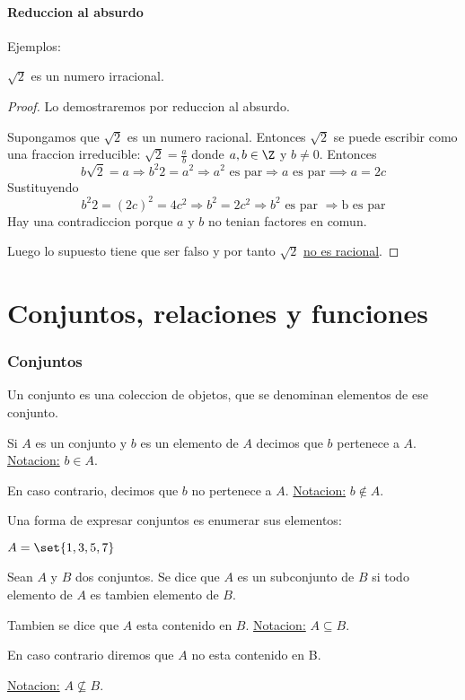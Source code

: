 \subsection*{Reduccion al absurdo}
Ejemplos:
\begin{theorem}
	\(\sqrt{2} \) es un numero irracional.
\end{theorem}
\begin{proof}
	Lo demostraremos por reduccion al absurdo.

	Supongamos que \(\sqrt{2} \) es un numero racional. Entonces \(\sqrt{2} \) se puede escribir como una fraccion irreducible: \(\sqrt{2 } = \frac{a}{b } \) donde \(a,b \in \Z \) y \(b \neq 0 \). Entonces
	\[
		b\sqrt{2} = a \Rightarrow b^{2}2 = a^{2} \Rightarrow a^{2} \text{ es par} \Rightarrow a \text{ es par} \implies a = 2c
	\]
	Sustituyendo
	\[
		b^{2}2 = (2c)^{2} = 4c^{2} \Rightarrow b^{2} = 2c^{2} \Rightarrow b^{2 } \text{ es par } \Rightarrow \boxed{\text{b es par} }
	\]
	Hay una contradiccion porque \(a \) y \(b \) no tenian factores en comun.

	Luego lo supuesto tiene que ser falso y por tanto \(\sqrt{2} \) \underline{no es racional}.
\end{proof}

\part{Conjuntos, relaciones y funciones}
\section{Conjuntos}
\begin{definition}
	Un conjunto es una coleccion de objetos, que se denominan elementos de ese conjunto.

	Si \(A \) es un conjunto y \(b \) es un elemento de \(A \) decimos que \(b \) pertenece a \(A \). \underline{Notacion:} \(b \in A \).

	En caso contrario, decimos que \(b \) no pertenece a \(A \). \underline{Notacion:} \(b \notin A \).
\end{definition}
Una forma de expresar conjuntos es enumerar sus elementos:
\begin{example}
	\(A = \set{1,3,5,7}\)
\end{example}

\begin{definition}[Subconjunto]
	Sean \(A \) y \(B \) dos conjuntos. Se dice que \(A \) es un subconjunto de \(B \) si todo elemento de \(A \) es tambien elemento de \(B \).

	Tambien se dice que \(A \) esta contenido en \(B \). \underline{Notacion:} \(A \subseteq B \).

	En caso contrario diremos que \(A \) no esta contenido en B.

	\underline{Notacion:} \( A \not\subseteq B\).
\end{definition}

